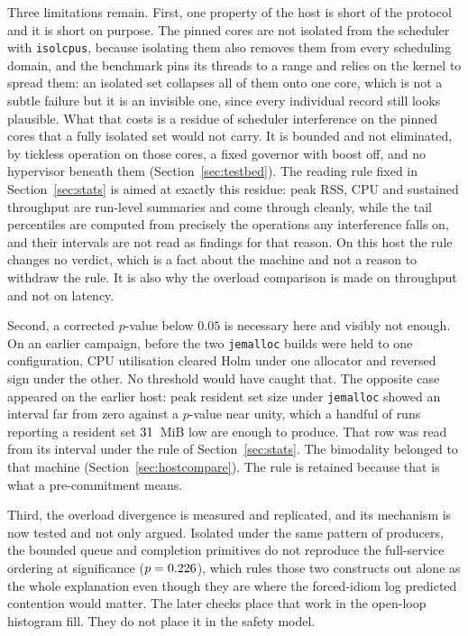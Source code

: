 \documentclass[english,oneside,a4paper,censored,csm,software-track-2020]{HYthesisML}
\begin{document}
Three limitations remain. First, one property of the host is short of the protocol and it is short
on purpose. The pinned cores are not isolated from the scheduler with \texttt{isolcpus}, because
isolating them also removes them from every scheduling domain, and the benchmark pins its threads to
a range and relies on the kernel to spread them: an isolated set collapses all of them onto one
core, which is not a subtle failure but it is an invisible one, since every individual record still
looks plausible. What that costs is a residue of scheduler interference on the pinned cores that a
fully isolated set would not carry. It is bounded and not eliminated, by tickless operation on
those cores, a fixed governor with boost off, and no hypervisor beneath them
(Section~\ref{sec:testbed}). The reading rule fixed in Section~\ref{sec:stats} is aimed at exactly
this residue: peak RSS, CPU and sustained throughput are run-level summaries and come through
cleanly, while the tail percentiles are computed from precisely the operations any interference
falls on, and their intervals are not read as findings for that reason. On this host the rule
changes no verdict, which is a fact about the machine and not a reason to withdraw the rule. It is
also why the overload comparison is made on throughput and not on latency.

Second, a corrected $p$-value below $0.05$ is necessary here and visibly not enough. On an earlier
campaign, before the two \texttt{jemalloc} builds were held to one configuration, CPU utilisation
cleared Holm under one allocator and reversed sign under the other. No threshold would have
caught that. The opposite case appeared on the earlier host: peak resident set size under
\texttt{jemalloc} showed an interval far from zero against a $p$-value near unity, which a
handful of runs reporting a resident set $31$~MiB low are enough to produce.
That row was read from its interval under the rule of Section~\ref{sec:stats}. The bimodality
belonged to that machine (Section~\ref{sec:hostcompare}). The rule is retained because that is
what a pre-commitment means.

Third, the overload divergence is measured and replicated, and its mechanism is now tested and
not only argued. Isolated under the same pattern of \ContentionProducers{} producers, the bounded
queue and completion primitives do not reproduce the full-service ordering at significance
($p = 0.226$), which rules those two constructs out alone as the whole explanation even
though they are where the forced-idiom log predicted contention would matter. The later checks place that work in the open-loop histogram fill.
They do not place it in the safety model.
\end{document}
